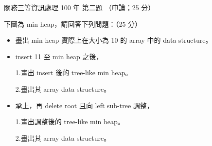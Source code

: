 \begin{pastexam}[label={px:gw3-100-ds-02}]{關務三等資訊處理 100 年 第二題}
（申論；25 分）

下圖為 min heap，請回答下列問題：（25 分）
\begin{center}
\end{center}
\begin{itemize}[leftmargin=2.2em]
\item[㈠] 畫出 min heap 實際上在大小為 10 的 array 中的 data structure。
\item[㈡] insert 11 至 min heap 之後，

\quad 1.畫出 insert 後的 tree-like min heap。

\quad 2.畫出其 array data structure。
\item[㈢] 承上，再 delete root 且向 left sub-tree 調整，

\quad 1.畫出調整後的 tree-like min heap。

\quad 2.畫出其 array data structure。
\end{itemize}
\end{pastexam}

